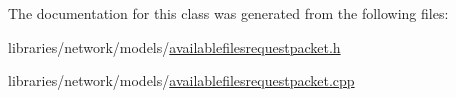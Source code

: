 The documentation for this class was generated from the following files:\begin{DoxyCompactItemize}
\item 
libraries/network/models/\hyperlink{availablefilesrequestpacket_8h}{availablefilesrequestpacket.h}\item 
libraries/network/models/\hyperlink{availablefilesrequestpacket_8cpp}{availablefilesrequestpacket.cpp}\end{DoxyCompactItemize}
